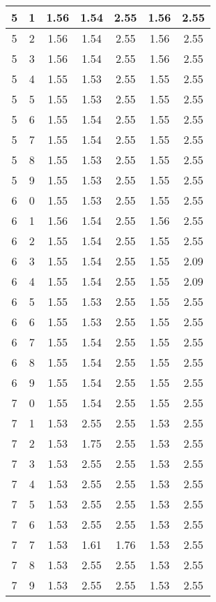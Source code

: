 \begin{longtable}{|c|c||c||c|c||c|c|}
	5 & 1 & 1.56 & 1.54 & 2.55 & 1.56 & 2.55 \\ \hline
	5 & 2 & 1.56 & 1.54 & 2.55 & 1.56 & 2.55 \\ \hline
	5 & 3 & 1.56 & 1.54 & 2.55 & 1.56 & 2.55 \\ \hline
	5 & 4 & 1.55 & 1.53 & 2.55 & 1.55 & 2.55 \\ \hline
	5 & 5 & 1.55 & 1.53 & 2.55 & 1.55 & 2.55 \\ \hline
	5 & 6 & 1.55 & 1.54 & 2.55 & 1.55 & 2.55 \\ \hline
	5 & 7 & 1.55 & 1.54 & 2.55 & 1.55 & 2.55 \\ \hline
	5 & 8 & 1.55 & 1.53 & 2.55 & 1.55 & 2.55 \\ \hline
	5 & 9 & 1.55 & 1.53 & 2.55 & 1.55 & 2.55 \\ \hline
	6 & 0 & 1.55 & 1.53 & 2.55 & 1.55 & 2.55 \\ \hline
	6 & 1 & 1.56 & 1.54 & 2.55 & 1.56 & 2.55 \\ \hline
	6 & 2 & 1.55 & 1.54 & 2.55 & 1.55 & 2.55 \\ \hline
	6 & 3 & 1.55 & 1.54 & 2.55 & 1.55 & 2.09 \\ \hline
	6 & 4 & 1.55 & 1.54 & 2.55 & 1.55 & 2.09 \\ \hline
	6 & 5 & 1.55 & 1.53 & 2.55 & 1.55 & 2.55 \\ \hline
	6 & 6 & 1.55 & 1.53 & 2.55 & 1.55 & 2.55 \\ \hline
	6 & 7 & 1.55 & 1.54 & 2.55 & 1.55 & 2.55 \\ \hline
	6 & 8 & 1.55 & 1.54 & 2.55 & 1.55 & 2.55 \\ \hline
	6 & 9 & 1.55 & 1.54 & 2.55 & 1.55 & 2.55 \\ \hline
	7 & 0 & 1.55 & 1.54 & 2.55 & 1.55 & 2.55 \\ \hline
	7 & 1 & 1.53 & 2.55 & 2.55 & 1.53 & 2.55 \\ \hline
	7 & 2 & 1.53 & 1.75 & 2.55 & 1.53 & 2.55 \\ \hline
	7 & 3 & 1.53 & 2.55 & 2.55 & 1.53 & 2.55 \\ \hline
	7 & 4 & 1.53 & 2.55 & 2.55 & 1.53 & 2.55 \\ \hline
	7 & 5 & 1.53 & 2.55 & 2.55 & 1.53 & 2.55 \\ \hline
	7 & 6 & 1.53 & 2.55 & 2.55 & 1.53 & 2.55 \\ \hline
	7 & 7 & 1.53 & 1.61 & 1.76 & 1.53 & 2.55 \\ \hline
	7 & 8 & 1.53 & 2.55 & 2.55 & 1.53 & 2.55 \\ \hline
	7 & 9 & 1.53 & 2.55 & 2.55 & 1.53 & 2.55 \\ \hline
\end{longtable}
